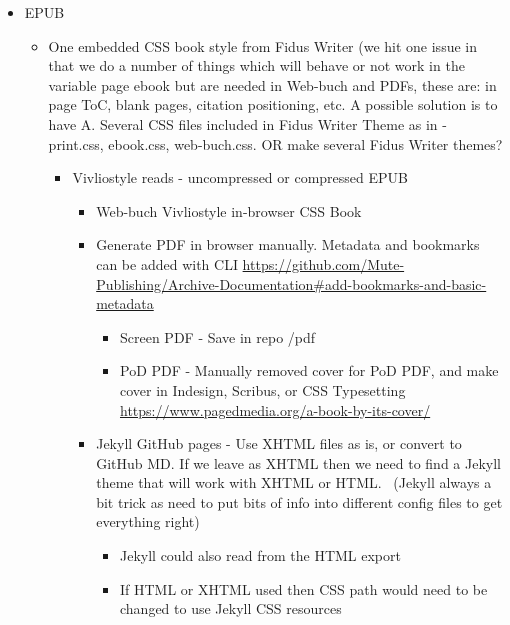 \documentclass{article}
\begin{document}
\begin{itemize}
\item EPUB

\begin{itemize}
\item One embedded CSS book style from Fidus Writer (we hit one issue in that we do a number of things which will behave or not work in the variable page ebook but are needed in Web-buch and PDFs, these are: in page ToC, blank pages, citation positioning, etc. A possible solution is to have A. Several CSS files included in Fidus Writer Theme as in - print.css, ebook.css, web-buch.css. OR make several Fidus Writer themes?

\begin{itemize}
\item Vivliostyle reads - uncompressed or compressed EPUB

\begin{itemize}
\item Web-buch Vivliostyle in-browser CSS Book


\item Generate PDF in browser manually. Metadata and bookmarks can be added with CLI \href{https://github.com/Mute-Publishing/Archive-Documentation#add-bookmarks-and-basic-metadata}{https://github.com/Mute-Publishing/Archive-Documentation\#add-bookmarks-and-basic-metadata}

\begin{itemize}
\item Screen PDF - Save in repo /pdf


\item PoD PDF - Manually removed cover for PoD PDF, and make cover in Indesign, Scribus, or CSS Typesetting \href{https://www.pagedmedia.org/a-book-by-its-cover/}{https://www.pagedmedia.org/a-book-by-its-cover/}


\end{itemize}

\item Jekyll GitHub pages - Use XHTML files as is, or convert to GitHub MD. If we leave as XHTML then we need to find a Jekyll theme that will work with XHTML or HTML.  (Jekyll always a bit trick as need to put bits of info into different config files to get everything right)

\begin{itemize}
\item Jekyll could also read from the HTML export


\item If HTML or XHTML used then CSS path would need to be changed to use Jekyll CSS resources



\end{itemize}
\end{itemize}
\end{itemize}
\end{itemize}
\end{itemize}
\end{document}
